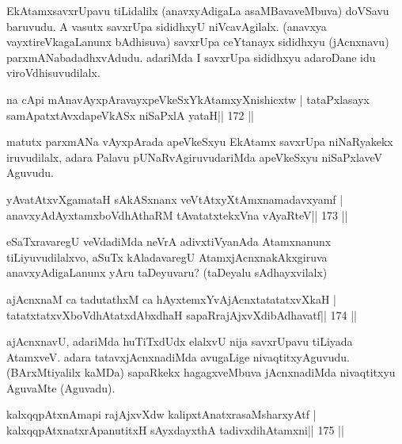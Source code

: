 \begin{artha}
EkAtamxsavxrUpavu tiLidalilx (anavxyAdigaLa asaMBavaveMbuva) doVSavu 
baruvudu. A vasutx savxrUpa sididhxyU niVcavAgilalx. (anavxya 
vayxtireVkagaLanunx bAdhisuva) savxrUpa ceYtanayx sididhxyu (jAcnxnavu) parxmANabadadhxvAdudu. adariMda I savxrUpa sididhxyu adaroDane idu viroVdhisuvudilalx.
\end{artha}

\begin{shl}
na cApi mAnavAyxpAravayxpeVkeSxYkAtamxyXnishicxtw |
tataPxlasayx samApatxtAvxdapeVkASx niSaPxlA yataH\hfill || 172 ||
\end{shl}

\begin{artha}
matutx parxmANa vAyxpArada apeVkeSxyu EkAtamx savxrUpa niNaRyakekx iruvudilalx, adara Palavu pUNaRvAgiruvudariMda apeVkeSxyu niSaPxlaveV Aguvudu.
\end{artha}

\begin{shl}
yAvatAtxvXgamataH sAkASxnanx veVtAtxyXtAmxnamadavxyamf |
anavxyAdAyxtamxboVdhAthaRM tAvatatxtekxVna vAyaRteV\hfill || 173 ||
\end{shl}

\begin{artha}
eSaTxravaregU veVdadiMda neVrA adivxtiVyanAda Atamxnanunx tiLiyuvudilalxvo, aSuTx kAladavaregU AtamxjAcnxnakAkxgiruva anavxyAdigaLanunx yAru taDeyuvaru? (taDeyalu sAdhayxvilalx)
\end{artha}

\begin{shl}
ajAcnxnaM ca tadutathxM ca hAyxtemxYvAjAcnxtatatatxvXkaH |
tatatxtatxvXboVdhAtatxdAbxdhaH sapaRrajAjxvXdibAdhavatf\hfill || 174 ||
\end{shl}

\begin{artha}
ajAcnxnavU, adariMda huTiTxdUdx elalxvU nija savxrUpavu tiLiyada  AtamxveV. adara tatavxjAcnxnadiMda avugaLige nivaqtitxyAguvudu.  (BArxMtiyalilx kaMDa) sapaRkekx hagagxveMbuva jAcnxnadiMda nivaqtitxyu  AguvaMte (Aguvadu).
\end{artha}


\begin{shl}
kalxqqpAtxnAmapi rajAjxvXdw kalipxtAnatxrasaMsharxyAtf |
kalxqqpAtxnatxrApanutitxH sAyxdayxthA tadivxdihA\s\s tamxni\hfill || 175 ||
\end{shl}

